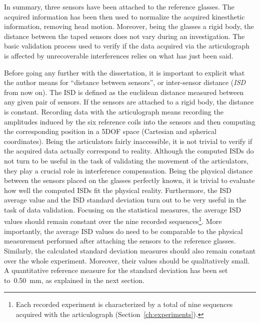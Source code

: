 In summary, three sensors have been attached to the reference
glasses. The acquired information has been then used to normalize the acquired
kinesthetic information, removing head motion. 
Moreover, being the glasses a rigid body, the distance between the taped 
sensors does not vary during an investigation.
The basic validation process used to verify if the data acquired via the 
articulograph is affected by unrecoverable interferences relies on what has just
been said.

Before going any further with the dissertation, it is important to explicit what
the author means for ``distance between sensors'', or inter-sensor distance 
(\emph{ISD} from now on).
The ISD is defined as the euclidean distance measured between any given pair 
of sensors.
If the sensors are attached to a rigid body, the distance is constant. 
Recording data with the articulograph means recording the amplitudes induced
by the six reference coils into the sensors and then computing the corresponding
position in a 5DOF space (Cartesian and spherical coordinates).
Being the articulators fairly inaccessible, it is not trivial to verify if the
acquired data actually correspond to reality.
Although the computed ISDs do not turn to be useful in the task of validating
the movement of the articulators, they play a crucial role in 
interference compensation.
Being the physical distance between the sensors placed on the glasses perfectly
known, it is trivial to evaluate how well the computed ISDs fit the physical
reality.
Furthermore, the ISD average value and the ISD standard deviation 
turn out to be very useful in the task of data validation.
Focusing on the statistical measures, the average ISD values should remain
constant over the nine recorded sequences\footnote{Each recorded experiment is
characterized by a total of nine sequences acquired with the articulograph 
(Section~\ref{ch:experiments}).}.
More importantly, the average ISD values do need to be comparable to the
physical measurement performed after attaching the sensors to the reference
glasses.
Similarly, the calculated standard deviation measures should also remain
constant over the whole experiment.
Moreover, their values should be qualitatively small.
A quantitative reference measure for the standard deviation has been set
to~0.50~mm, as explained in the next section.

